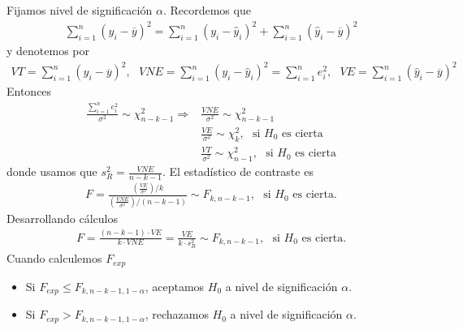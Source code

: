 Fijamos nivel de significación $\alpha$. Recordemos que
\begin{align*}
    \sum_{i=1}^{n} (y_i -\overline{y})^2 = \sum_{i=1}^{n} (y_i - \widehat{y}_i)^2 + \sum_{i=1}^{n} (\widehat{y}_i - \overline{y})^2
\end{align*}
y denotemos por
\begin{align*}
    VT = \sum_{i=1}^{n} (y_i -\overline{y})^2, \ \ \ VNE = \sum_{i=1}^{n} (y_i - \widehat{y}_i)^2 = \sum_{i=1}^{n} e_i^2, \ \ \  VE = \sum_{i=1}^{n} (\widehat{y}_i - \overline{y})^2
\end{align*}
Entonces
\begin{align*}
    \frac{\sum_{i=1}^{n} e_i^2}{\sigma^2} \sim \chi^2_{n-k-1} \Longrightarrow & \frac{VNE}{\sigma^2} \sim \chi^2_{n-k-1}                               \\
                                                                              & \frac{VE}{\sigma^2} \sim \chi^2_k, \ \ \ \text{si $H_0$ es cierta}     \\
                                                                              & \frac{VT}{\sigma^2} \sim \chi^2_{n-1}, \ \ \ \text{si $H_0$ es cierta}
\end{align*}
donde usamos que $s_R^2 = \frac{VNE}{n-k-1}$. El estadístico de contraste es
\begin{align*}
    F = \frac{\left(\frac{VE}{\sigma^2}\right)/k}{\left(\frac{VNE}{\sigma^2}\right)/(n-k-1)} \sim F_{k,n-k-1}, \ \ \ \text{si $H_0$ es cierta}.
\end{align*}
Desarrollando cálculos
\begin{align*}
    F = \frac{(n-k-1) \cdot VE}{k \cdot VNE} = \frac{VE}{k \cdot s_R^2} \sim F_{k,n-k-1}, \ \ \ \text{si $H_0$ es cierta}.
\end{align*}
Cuando calculemos $F_{exp}$
\begin{itemize}
    \item Si $F_{exp} \leq F_{k,n-k-1,1-\alpha}$, aceptamos $H_0$ a nivel de significación $\alpha$.
    \item Si $F_{exp} > F_{k,n-k-1,1-\alpha}$, rechazamos $H_0$ a nivel de significación $\alpha$.
\end{itemize}

